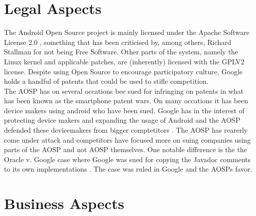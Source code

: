 \documentclass[conference]{IEEEtran}
\begin{document}
\section{Legal Aspects}
\label{legal}


The Android Open Source project is mainly licensed under the Apache Software License 2.0 \cite{apache-license}, something that has been criticised by, among others, Richard Stallman for not being Free Software\cite{rms-android}. Other parts of the system, namely the Linux kernel and applicable patches, are (inherently) licensed with the GPLV2 license\cite{gplv2}\cite{android-licenses}. Despite using Open Source to encourage participatory culture, Google holds a handful of patents that could be used to stifle competition\cite{google-slide-unlock}\cite{google-radial-menu}. 
\\

The AOSP has on several occations bee sued for infringing on patents in what has been known as the smartphone patent wars. On many occations it has been device makers using android who have been sued\cite{android-vApple}. Google has in the interest of protecting device makers and expanding the usage of Android and the AOSP defended these devicemakers from bigger comptetitors \cite{google-helps}. The AOSP has rearerly come under attack and competitors have focused more on suing companies using parts of the AOSP and not AOSP themselves. One notable difference is the the Oracle v. Google case where Google was sued for copying the Javadoc comments to its own implementations \cite{android-v-oracle}. The case was ruled in Google and the AOSPs favor.

\section{Business Aspects}
\label{financial}
\end{document}
